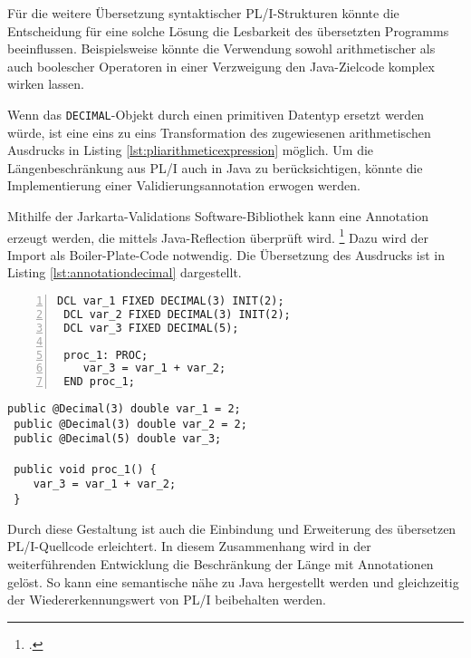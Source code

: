 Für die weitere Übersetzung syntaktischer PL/I-Strukturen könnte die Entscheidung für eine solche Lösung die Lesbarkeit des übersetzten Programms beeinflussen. Beispielsweise könnte die Verwendung sowohl arithmetischer als auch boolescher Operatoren in einer Verzweigung den Java-Zielcode komplex wirken lassen. 

Wenn das \verb+DECIMAL+-Objekt durch einen primitiven Datentyp ersetzt werden würde, ist eine eins zu eins Transformation des zugewiesenen arithmetischen Ausdrucks in Listing \ref{lst:pliarithmeticexpression} möglich. Um die Längenbeschränkung aus PL/I auch in Java zu berücksichtigen, könnte die Implementierung einer Validierungsannotation erwogen werden.

Mithilfe der Jarkarta-Validations Software-Bibliothek kann eine Annotation erzeugt werden, die mittels Java-Reflection überprüft wird. \footcite[Vgl. ][]{jakarta}
Dazu wird der Import als Boiler-Plate-Code  notwendig. 
Die Übersetzung des Ausdrucks ist in Listing \ref{lst:annotationdecimal} dargestellt.

\begin{minipage}[b]{0.48\linewidth}
	\centering
	\lstset{language=PL/I,label=SliceExaple}
	\begin{lstlisting}[frame=single, numbers=left, mathescape,%
		caption={Annotationslösung}, label={lst:annotationdecimal},
		basicstyle=\fontsize{9}{13}\selectfont\ttfamily]
 DCL var_1 FIXED DECIMAL(3) INIT(2);
 DCL var_2 FIXED DECIMAL(3) INIT(2);
 DCL var_3 FIXED DECIMAL(5);
		
 proc_1: PROC;
	var_3 = var_1 + var_2;
 END proc_1;
	\end{lstlisting}
\end{minipage}
\hspace{0.5cm}
\begin{minipage}[b]{0.48\linewidth}
	\centering
	\lstset{language=Java,label=SliceExaple}
	\begin{lstlisting}[frame=single, mathescape,%
		title={" "},
		basicstyle=\fontsize{9}{13}\selectfont\ttfamily]
 public @Decimal(3) double var_1 = 2;
 public @Decimal(3) double var_2 = 2;
 public @Decimal(5) double var_3;
		
 public void proc_1() {
 	var_3 = var_1 + var_2;
 }
	\end{lstlisting}
\end{minipage}

Durch diese Gestaltung ist auch die Einbindung und Erweiterung des übersetzen PL/I-Quellcode erleichtert. In diesem Zusammenhang wird in der weiterführenden Entwicklung die Beschränkung der Länge mit Annotationen gelöst. 
So kann eine semantische nähe zu Java hergestellt werden und gleichzeitig der Wiedererkennungswert von PL/I beibehalten werden.

